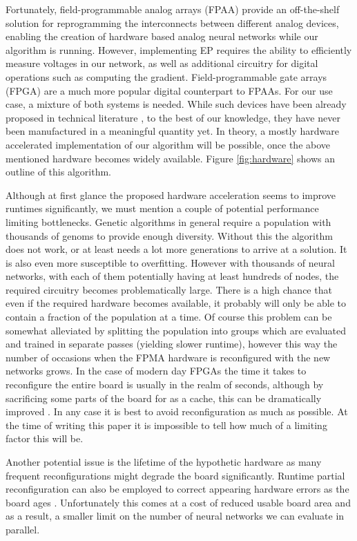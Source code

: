 \documentclass[lettersize,journal]{IEEEtran}
\newcommand{\eqprop}{EP }
\begin{document}
		Fortunately, field-programmable analog arrays (FPAA) provide an off-the-shelf solution for reprogramming the interconnects between different analog devices, enabling the creation of hardware based analog neural networks \cite{fpaa-neural-network} while our algorithm is running. However, implementing \eqprop requires the ability to efficiently measure voltages in our network, as well as additional circuitry for digital operations such as computing the gradient. Field-programmable gate arrays (FPGA) are a much more popular digital counterpart to FPAAs. For our use case, a mixture of both systems is needed. While such devices have been already proposed in technical literature \cite{fgbfpmsa}, to the best of our knowledge, they have never been manufactured in a meaningful quantity yet. In theory, a mostly hardware accelerated implementation of our algorithm will be possible, once the above mentioned hardware becomes widely available. Figure \ref{fig:hardware} shows an outline of this algorithm. 
		
		Although at first glance the proposed hardware acceleration seems to improve runtimes significantly, we must mention a couple of potential performance limiting bottlenecks. Genetic algorithms in general require a population with thousands of genoms to provide enough diversity. Without this the algorithm does not work, or at least needs a lot more generations to arrive at a solution. It is also even more susceptible to overfitting. However with thousands of neural networks, with each of them potentially having at least hundreds of nodes, the required circuitry becomes problematically large. There is a high chance that even if the required hardware becomes available, it probably will only be able to contain a fraction of the population at a time. Of course this problem can be somewhat alleviated by splitting the population into groups which are evaluated and trained in separate passes (yielding slower runtime), however this way the number of occasions when the FPMA hardware is reconfigured with the new networks grows. In the case of modern day FPGAs the time it takes to reconfigure the entire board is usually in the realm of seconds, although by sacrificing some parts of the board for as a cache, this can be dramatically improved \cite{runtime-partial-reconfiguration-speed}. In any case it is best to avoid reconfiguration as much as possible. At the time of writing this paper it is impossible to tell how much of a limiting factor this will be.
		
		Another potential issue is the lifetime of the hypothetic hardware as many frequent reconfigurations might degrade the board significantly. Runtime partial reconfiguration can also be employed to correct appearing hardware errors as the board ages \cite{runtime-partial-reconfiguration-reliability}. Unfortunately this comes at a cost of reduced usable board area and as a result, a smaller limit on the number of neural networks we can evaluate in parallel.  %
		
\end{document}
